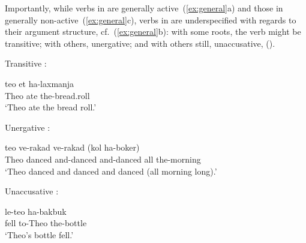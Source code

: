 \begin{exe}
\begin{xlist}
\begin{exe}
\begin{exe}
\begin{exe}
\begin{exe}
\begin{xlist}
\begin{exe}
\begin{xlist}
\begin{xlist}
\begin{xlist}
\begin{exe}
\begin{xlist}
\begin{exe}
\begin{exe}
\begin{exe}
\begin{exe}
\begin{xlist}
\begin{exe}
\begin{xlist}
\begin{exe}
\begin{exe}
\begin{xlist}
\begin{exe}
\begin{xlist}
\begin{exe}
\begin{xlist}
\begin{exe}
\begin{exe}
\begin{xlist}
\begin{exe}
\begin{exe}
\begin{xlist}
\begin{exe}
\begin{exe}
\begin{xlist}
\begin{exe}
\begin{exe}
\begin{xlist}
\begin{exe}
\begin{xlist}
\begin{exe}
\begin{exe}
\begin{exe}
\begin{exe}
\begin{xlist}
\begin{exe}
\begin{xlist}
\begin{exe}
\begin{exe}
\begin{exe}
\begin{exe}
\begin{exe}
Importantly, while verbs in {\thif} are generally active~(\ref{ex:general}a) and those in {\tnif} generally non-active~(\ref{ex:general}c), verbs in {\tkal} are underspecified with regards to their argument structure, cf.~(\ref{ex:general}b): with some roots, the verb might be transitive; with others, unergative; and with others still, unaccusative, (\nextx).
 \begin{exe}
 \ex \label{ex:kal} 
 \begin{xlist} 
 	\ex  Transitive {\tkal}: 
	
 		\gll  teo  et ha-laxmanja\\
 		  Theo ate  the-bread.roll\\
 		\glt `Theo ate the bread roll.' 
	

 	\ex  Unergative {\tkal}: 
	
 		\gll  teo  ve-rakad ve-rakad (kol ha-boker)\\
 		  Theo danced and-danced and-danced all the-morning\\
 		\glt `Theo danced and danced and danced (all morning long).' 
	

 	\ex  Unaccusative {\tkal}: 
	
 		\gll  {} le-teo ha-bakbuk\\
 		  fell to-Theo the-bottle\\
 		\glt `Theo's bottle fell.' 
	
	
 \z
\z 


\end{xlist}
\end{exe}
\end{exe}
\end{exe}
\end{exe}
\end{exe}
\end{exe}
\end{xlist}
\end{exe}
\end{xlist}
\end{exe}
\end{exe}
\end{exe}
\end{exe}
\end{xlist}
\end{exe}
\end{xlist}
\end{exe}
\end{exe}
\end{xlist}
\end{exe}
\end{exe}
\end{xlist}
\end{exe}
\end{exe}
\end{xlist}
\end{exe}
\end{exe}
\end{xlist}
\end{exe}
\end{xlist}
\end{exe}
\end{xlist}
\end{exe}
\end{exe}
\end{xlist}
\end{exe}
\end{xlist}
\end{exe}
\end{exe}
\end{exe}
\end{exe}
\end{xlist}
\end{exe}
\end{xlist}
\end{xlist}
\end{xlist}
\end{exe}
\end{xlist}
\end{exe}
\end{exe}
\end{exe}
\end{exe}
\end{xlist}
\end{exe}
